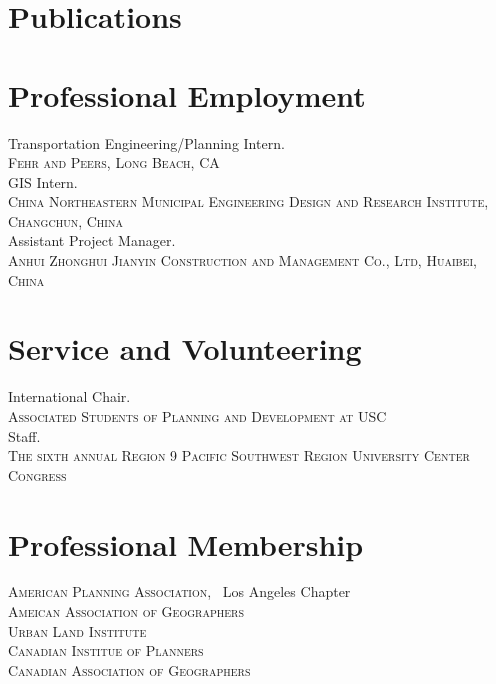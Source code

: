 \documentclass[12pt]{article}
\begin{document}
\section{Publications}
\begin{etaremune}[itemsep=0pt, parsep=0pt, leftmargin = \enumleftmargin] 
\end{etaremune}


\section{Professional Employment}
Transportation Engineering/Planning Intern. \\
\textsc{Fehr and Peers, Long Beach, CA}\\

GIS Intern.  \\
\textsc{China Northeastern Municipal Engineering Design and Research Institute, Changchun, China} \\

Assistant Project Manager.  \\
\textsc{Anhui Zhonghui Jianyin Construction and Management Co., Ltd, Huaibei, China} \\


\section{Service and Volunteering}
International Chair. \\
\textsc{Associated Students of Planning and Development at USC}\\

Staff. \\
\textsc{The sixth annual Region 9 Pacific Southwest Region University Center Congress}\\

\section{Professional Membership}
\textsc{American Planning Association},  \ Los Angeles Chapter\\
\textsc{Ameican Association of Geographers}\\
\textsc{Urban Land Institute}\\
\textsc{Canadian Institue of Planners}\\
\textsc{Canadian Association of Geographers}\\
\end{document}
